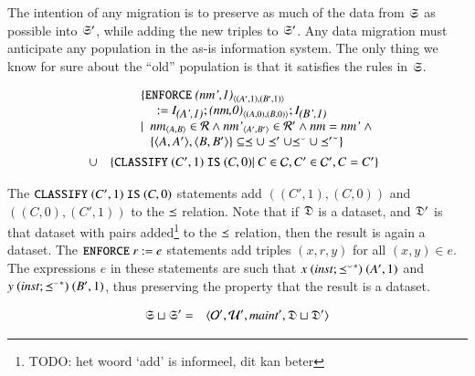 \documentclass{elsarticle}
\begin{document}
	The intention of any migration is to preserve as much of the data from $\mathfrak{S}$ as possible into $\mathfrak{S}'$,
	while adding the new triples to $\mathfrak{S}'$.
	Any data migration must anticipate any population in the as-is information system.
	The only thing we know for sure about the ``old'' population is that it satisfies the rules in $\mathfrak{S}$.

\begin{definition}
	\begin{eqnarray}
		&&\begin{array}[t]{@{}l}
			\{ {\tt ENFORCE\ }\declare{(nm',1)}{(A',1)}{(B',1)}\\\quad{\tt\ :=\ }\ident{(A',1)};\declare{(nm,0)}{(A,0)}{(B,0)};\ident{(B',1)}\\
				\mid\ \begin{array}[t]{@{}l}
					\declare{nm}{A}{B}\in\rels\wedge\declare{nm'}{A'}{B'}\in\rels'\wedge\id{nm}=\id{nm'}\ \wedge\\
					\{\pair{A}{A'},\pair{B}{B'}\}\subseteq\isa\cup\isa'\cup\flip{\isa}\cup\flip{\isa'}\}
				   \end{array}
			  \end{array}\\
			  &\cup&\begin{array}[t]{@{}l}
				\{ {\tt CLASSIFY\ }(C',1){\tt\ IS\ }(C,0)|\ C\in\concepts,C'\in\concepts',C=C'\}\\
			  \end{array}
	\end{eqnarray}
\end{definition}

The ${\tt CLASSIFY\ }(C',1){\tt\ IS\ }(C,0)$ statements add $((C',1),(C,0))$ and  $((C,0),(C',1))$ to the $\preceq$ relation. Note that if $\mathfrak{D}$ is a dataset, and $\mathfrak{D}'$ is that dataset with pairs added\footnote{TODO: het woord `add' is informeel, dit kan beter} to the $\preceq$ relation, then the result is again a dataset.
The ${\tt ENFORCE\ }r{\tt\ :=\ }e$ statements add triples $(x,r,y)$ for all $(x,y)\in e$.
The expressions $e$ in these statements are such that $x\ (\text{\it inst\/} ; {{\preceq}^\smallsmile}^*)\ (A',1)$ and $y \ (\inst \compose \kleenestar{\flip{\isa}})\ (B',1)$, thus preserving the property that the result is a dataset.

\begin{definition}[]
	\begin{eqnarray}
		\mathfrak{S}\sqcup\mathfrak{S}'&=&\langle\mathcal{O}',\mathcal{U}',\text{\it maint\/}',\mathfrak{D}\sqcup\mathfrak{D}'\rangle
	\end{eqnarray}
\end{definition}
\end{document}
